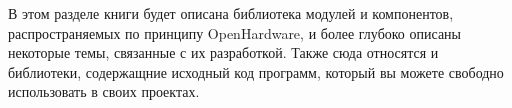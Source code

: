 \label{libs}\secdown

В этом разделе книги будет описана библиотека модулей и компонентов,
распространяемых по принципу OpenHardware, и более глубоко описаны некоторые
темы, связанные с их разработкой. Также сюда относятся и библиотеки, содержащние
исходный код программ, который вы можете свободно использовать в своих проектах.

\clearpage



\secup

